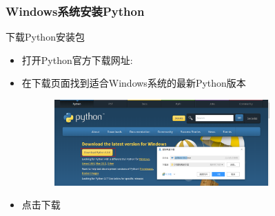 \begin{frame}
	\frametitle{\textrm{Windows}系统安装\textrm{Python}}
	    下载\textrm{Python}安装包
            \begin{itemize}
		    \item 打开\textrm{Python}官方下载网址:~\\\href{https://www.python.org/downloads/}{\fontsize{7.2pt}{4.2pt}\selectfont{(https://www.python.org/downloads/)}}
		    \item 在下载页面找到适合\textrm{Windows}系统的最新\textrm{Python}版本\\{\fontsize{7.2pt}{4.2pt}}
\begin{figure}[h!]
\vspace*{-0.10in}
\centering
\includegraphics[height=1.3in, width=3.4in, viewport=0 0 1906 694,clip]{Figures/python_download-windows.png}
\label{Python-download_windows}
\end{figure}
\item 点击下载
            \end{itemize}
\end{frame}

